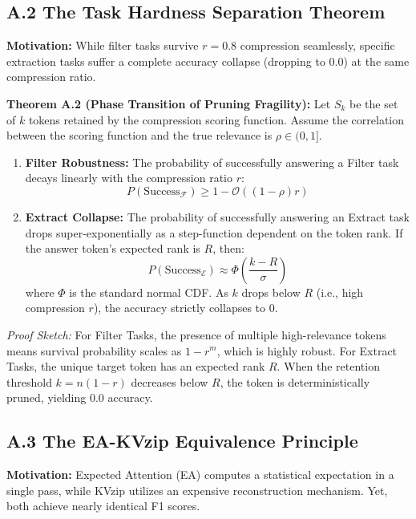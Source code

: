 \documentclass[10pt,a4paper]{article}
\begin{document}
\subsection*{A.2 The Task Hardness Separation Theorem}

\textbf{Motivation:} While filter tasks survive $r=0.8$ compression seamlessly, specific extraction tasks suffer a complete accuracy collapse (dropping to 0.0) at the same compression ratio.

\textbf{Theorem A.2 (Phase Transition of Pruning Fragility):}
Let $S_k$ be the set of $k$ tokens retained by the compression scoring function. Assume the correlation between the scoring function and the true relevance is $\rho \in (0, 1]$.
\begin{enumerate}
\item \textbf{Filter Robustness:} The probability of successfully answering a Filter task decays linearly with the compression ratio $r$:
\begin{equation}
P(\text{Success}_{\mathcal{F}}) \geq 1 - \mathcal{O}((1-\rho) r)
\end{equation}
\item \textbf{Extract Collapse:} The probability of successfully answering an Extract task drops super-exponentially as a step-function dependent on the token rank. If the answer token's expected rank is $R$, then:
\begin{equation}
P(\text{Success}_{\mathcal{E}}) \approx \Phi\left( \frac{k - R}{\sigma} \right)
\end{equation}
where $\Phi$ is the standard normal CDF. As $k$ drops below $R$ (i.e., high compression $r$), the accuracy strictly collapses to $0$.
\end{enumerate}

\textit{Proof Sketch:}
For Filter Tasks, the presence of multiple high-relevance tokens means survival probability scales as $1 - r^m$, which is highly robust. For Extract Tasks, the unique target token has an expected rank $R$. When the retention threshold $k = n(1-r)$ decreases below $R$, the token is deterministically pruned, yielding $0.0$ accuracy.

\subsection*{A.3 The EA-KVzip Equivalence Principle}

\textbf{Motivation:} Expected Attention (EA) computes a statistical expectation in a single pass, while KVzip utilizes an expensive reconstruction mechanism. Yet, both achieve nearly identical F1 scores.
\end{document}
